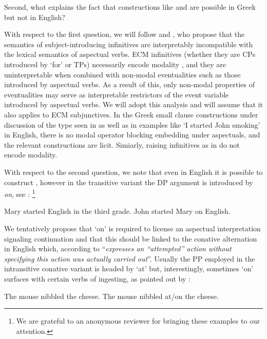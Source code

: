 \documentclass[output=paper]{langscibook}
\begin{document}
Second, what explains the fact that constructions like  and  are possible in Greek but not in English?

With respect to the first question, we will follow \citet{Grano2016} and \citet{MourounasWilliamson2019}, 
who propose that the semantics of subject-introducing infinitives are interpretably incompatible with the lexical semantics of aspectual verbs. 
ECM infinitives (whether they are CPs introduced by ‘for’ or TPs) necessarily encode modality 
\citep{kratzer2006,Moulton2009,Grano2016}, 
and they are uninterpretable when combined with non-modal eventualities such as those introduced by aspectual verbs. 
As a result of this, only non-modal properties of eventualities may serve as interpretable restrictors of the event variable introduced by aspectual verbs. 
We will adopt this analysis and will assume that it also applies to ECM subjunctives. 
In the Greek small clause constructions under discussion of the type seen in  as well as in examples like ‘I started John smoking’ in English, 
there is no modal operator blocking embedding under aspectuals, and the relevant constructions are licit. Simiarly, raising infinitives as in  do not encode modality.

With respect to the second question, we note that even in English it is possible to construct , 
however in the transitive variant the DP argument is introduced by \textit{on}, see \citet{Levin1993}:%
\footnote{
    We are grateful to an anonymous reviewer for bringing these examples to our attention.
}

\ea%
    \label{alexiadouex:key:20}
    \ea 
        \label{alexiadouex:key:20a}
        Mary started English in the third grade.
    \ex 
        \label{alexiadouex:key:20b}
        John started Mary on English.
    \z 
\z

We tentatively propose that ‘on’ is required to license an aspectual interpretation signaling continuation 
and that this should be linked to the conative alternation in English 
which, according to \citet[42]{Levin1993} “\textit{expresses an “attempted” action without specifying this action was actually carried out}”. 
Usually the PP employed in the intransitive conative variant is headed by ‘at’ 
but, interestingly, sometimes ‘on’ surfaces with certain verbs of ingesting, as pointed out by \citet{Levin1993}:

\ea%
    \label{alexiadouex:key:21}
    \ea The mouse  nibbled  the cheese. 
    \ex The mouse  nibbled  at/on the cheese. 
    \z 
\z 
    
\end{document}
